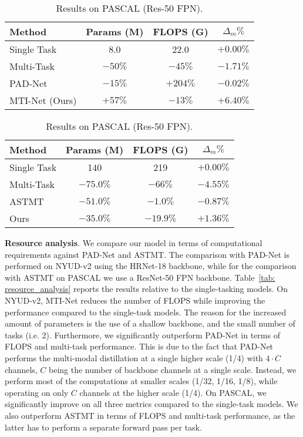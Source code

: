 \documentclass[runningheads]{llncs}
\begin{document}
\begin{table}[t]
    \caption{Computational resource analysis (number of parameters and FLOPS).}
    \label{tab: resource_analysis}
    \begin{subtable}[t]{0.47\linewidth}
    \caption{Results on NYUD-v2 (HRNet-18).}
    \label{tab: nyu_resources}
    \centering
    \tiny{
    \begin{tabular}{|l|c|c|c|}
    \hline
    Method & Params (M) & FLOPS (G) & $\Delta_{m} \%$ \\
    \hline
    Single Task & 8.0 & 22.0 & $+0.00\%$ \\
    Multi-Task & $-50\%$ & $-45\%$ & $-1.71\%$ \\
    PAD-Net & $-15\%$ & $+204\%$ & $-0.02\%$ \\
    MTI-Net (Ours) & $+57\%$ & $-13\%$ & $+6.40\%$ \\
    \hline
    \end{tabular}}
    \end{subtable}
    \hspace*{0.01\linewidth}
    \begin{subtable}[t]{0.47\linewidth}
    \centering
    \caption{Results on PASCAL (Res-50 FPN).}
    \label{tab: pascal_resources}
    \tiny{\begin{tabular}{|l|c|c|c|}
    \hline
    Method & Params (M) & FLOPS (G) & $\Delta_{m} \%$ \\
    \hline
    Single Task	& 140 & 219	& $+0.00\%$	\\
    Multi-Task & $-75.0\%$ & $-66\%$ & $-4.55\%$ \\
    ASTMT &	$-51.0\%$ & $-1.0\%$ & $-0.87\%$ \\
    Ours & $-35.0\%$ & $-19.9\%$ & $+1.36\%$ \\
    \hline
    \end{tabular}}
    \end{subtable}\end{table}

\noindent\textbf{Resource analysis}.
We compare our model in terms of computational requirements against PAD-Net and ASTMT. The comparison with PAD-Net is performed on NYUD-v2 using the HRNet-18 backbone, while for the comparison with ASTMT on PASCAL we use a ResNet-50 FPN backbone. Table~\ref{tab: resource_analysis} reports the results relative to the single-tasking models. On NYUD-v2, MTI-Net reduces the number of FLOPS while improving the performance compared to the single-task models. The reason for the increased amount of parameters is the use of a shallow backbone, and the small number of tasks (i.e. 2). Furthermore, we significantly outperform PAD-Net in terms of FLOPS and multi-task performance. This is due to the fact that PAD-Net performs the multi-modal distillation at a single higher scale (1/4) with $4 \cdot C$ channels, $C$ being the number of backbone channels at a single scale. Instead, we perform most of the computations at smaller scales (1/32, 1/16, 1/8), while operating on only $C$ channels at the higher scale (1/4). On PASCAL, we significantly improve on all three metrics compared to the single-task models. We also outperform ASTMT in terms of FLOPS and multi-task performance, as the latter has to perform a separate forward pass per task. 
\end{document}
